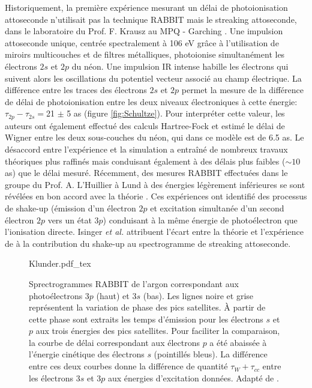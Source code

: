 Historiquement, la première expérience mesurant un délai de photoionisation attoseconde n'utilisait pas la technique RABBIT mais le streaking attoseconde, dans le laboratoire du Prof. F. Krausz au MPQ - Garching . Une impulsion attoseconde unique, centrée spectralement à 106 eV grâce à l'utilisation de miroirs multicouches et de filtres métalliques, photoionise simultanément les électrons $2s$ et $2p$ du néon. Une impulsion IR intense habille les électrons qui suivent alors les oscillations du potentiel vecteur associé au champ électrique. La différence entre les traces des électrons $2s$ et $2p$ permet la mesure de la différence de délai de photoionisation entre les deux niveaux électroniques à cette énergie: $\tau_{2p} - \tau_{2s} =$21 $\pm$ 5 as (figure \ref{fig:Schultze}). Pour interpréter cette valeur, les auteurs ont également effectué des calculs Hartree-Fock et estimé le délai de Wigner entre les deux sous-couches du néon, qui dans ce modèle est de 6.5 as. Le désaccord entre l'expérience et la simulation a entraîné de nombreux travaux théoriques  plus raffinés mais conduisant également à des délais plus faibles ($\sim 10$ as) que le délai mesuré. Récemment, des mesures RABBIT effectuées dans le groupe du Prof. A. L'Huillier à Lund à des énergies légèrement inférieures se sont révélées en bon accord avec la théorie . Ces expériences ont identifié des processus de shake-up (émission d'un électron $2p$ et excitation simultanée d'un second électron $2p$ vers un état $3p$) conduisant à la même énergie de photoélectron que l'ionisation directe. Isinger \textit{et al.} attribuent l'écart entre la théorie et l'expérience de  à la contribution du shake-up au spectrogramme de streaking attoseconde.

\begin{figure}[h]
\centering
\def\svgwidth{0.6\columnwidth}
{Klunder.pdf_tex}
\caption{Sprectrogrammes RABBIT de l'argon correspondant aux photoélectrons $3p$ (haut) et $3s$ (bas). Les lignes noire et grise représentent la variation de phase des pics satellites. \`A partir de cette phase sont extraits les temps d'émission pour les électrons $s$ et $p$ aux trois énergies des pics satellites. Pour faciliter la comparaison, la courbe de délai correspondant aux électrons $p$ a été abaissée à l'énergie cinétique des électrons $s$ (pointillés bleus). La différence entre ces deux courbes donne la différence de quantité $\tau_W + \tau_{cc}$ entre les électrons $3s$ et $3p$ aux énergies d'excitation données. Adapté de .}
\label{fig:Klunder}
\end{figure}

